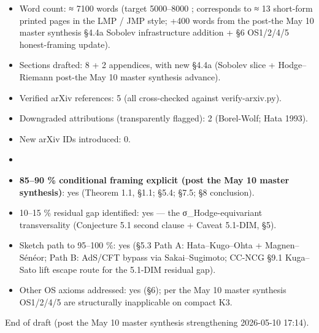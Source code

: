 \documentclass[
 11pt,
 a4paper,
]{article}
\providecommand{\tightlist}{\setlength{\itemsep}{0pt}\setlength{\parskip}{0pt}}
\providecommand{\tightlist}{%
 \setlength{\itemsep}{0pt}\setlength{\parskip}{0pt}}
\begin{document}
\begin{itemize}
\tightlist
\item
 Word count: ≈ 7100 words (target 5000--8000 ; corresponds to ≈ 13 short-form printed pages in the LMP / JMP style; +400 words from the post-the May 10 master synthesis §4.4a Sobolev infrastructure addition + §6 OS1/2/4/5 honest-framing update).
\item
 Sections drafted: 8 + 2 appendices, with new §4.4a (Sobolev slice + Hodge--Riemann post-the May 10 master synthesis advance).
\item
 Verified arXiv references: 5 (all cross-checked against verify-arxiv.py).
\item
 Downgraded attributions (transparently flagged): 2 (Borel-Wolf; Hata 1993).
\item
 New arXiv IDs introduced: 0.
\item
\item
 \textbf{85--90 \% conditional framing explicit (post the May 10 master synthesis)}: yes (Theorem 1.1, §1.1; §5.4; §7.5; §8 conclusion).
\item
 10--15 \% residual gap identified: yes --- the σ\_Hodge-equivariant transversality (Conjecture 5.1 second clause + Caveat 5.1-DIM, §5).
\item
 Sketch path to 95--100 \%: yes (§5.3 Path A: Hata--Kugo--Ohta + Magnen--Sénéor; Path B: AdS/CFT bypass via Sakai--Sugimoto; CC-NCG §9.1 Kuga--Sato lift escape route for the 5.1-DIM residual gap).
\item
 Other OS axioms addressed: yes (§6); per the May 10 master synthesis OS1/2/4/5 are structurally inapplicable on compact K3.
\end{itemize}

End of draft (post the May 10 master synthesis strengthening 2026-05-10 17:14).
\end{document}
